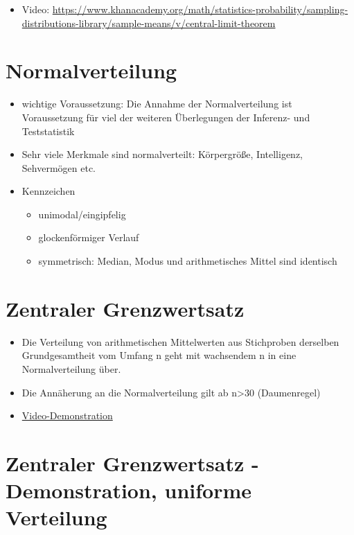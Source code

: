 \documentclass[
]{book}
\providecommand{\tightlist}{%
  \setlength{\itemsep}{0pt}\setlength{\parskip}{0pt}}
\begin{document}
\begin{itemize}
\tightlist
\item
  Video: \url{https://www.khanacademy.org/math/statistics-probability/sampling-distributions-library/sample-means/v/central-limit-theorem}
\end{itemize}

\hypertarget{normalverteilung}{%
\section{Normalverteilung}\label{normalverteilung}}

\begin{itemize}
\tightlist
\item
  wichtige Voraussetzung: Die Annahme der Normalverteilung ist Voraussetzung für viel der weiteren Überlegungen der Inferenz- und Teststatistik
\item
  Sehr viele Merkmale sind normalverteilt: Körpergröße, Intelligenz, Sehvermögen etc.
\item
  Kennzeichen

  \begin{itemize}
  \tightlist
  \item
    unimodal/eingipfelig
  \item
    glockenförmiger Verlauf
  \item
    symmetrisch: Median, Modus und arithmetisches Mittel sind identisch
  \end{itemize}
\end{itemize}

\hypertarget{zentraler-grenzwertsatz}{%
\section{Zentraler Grenzwertsatz}\label{zentraler-grenzwertsatz}}

\begin{itemize}
\tightlist
\item
  Die Verteilung von arithmetischen Mittelwerten aus Stichproben derselben Grundgesamtheit vom Umfang n geht mit wachsendem n in eine Normalverteilung über.
\item
  Die Annäherung an die Normalverteilung gilt ab n\textgreater30 (Daumenregel)
\item
  \href{https://www.youtube.com/watch?v=dlbkaurTAUg}{Video-Demonstration}
\end{itemize}

\hypertarget{zentraler-grenzwertsatz---demonstration-uniforme-verteilung}{%
\section{Zentraler Grenzwertsatz - Demonstration, uniforme Verteilung}\label{zentraler-grenzwertsatz---demonstration-uniforme-verteilung}}
\end{document}
